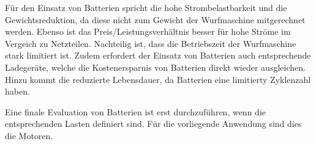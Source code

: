 Für den Einsatz von Batterien spricht die hohe Strombelastbarkeit und die
Gewichtsreduktion, da diese nicht zum Gewicht der Wurfmaschine mitgerechnet
werden. Ebenso ist das Preis/Leistungsverhältnis besser für
hohe Ströme im Vergeich zu Netzteilen. Nachteilig ist, dass die Betriebszeit
der Wurfmaschine stark limitiert ist. Zudem erfordert der Einsatz von
Batterien auch entsprechende Ladegeräte, welche die Kostenersparnis von
Batterien direkt wieder ausgleichen. Hinzu kommt die reduzierte Lebensdauer,
da Batterien eine limitierty Zyklenzahl haben. 

Eine finale Evaluation von Batterien ist erst durchzuführen, wenn die
entsprechenden Lasten definiert sind. Für die vorliegende Anwendung sind
dies die Motoren.
